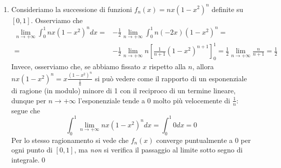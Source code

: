 \begin{examples}
\begin{enumerate}[label=\Roman*]
\begin{equation*}
\begin{cases}
\begin{array}{ll}
				\frac{1}{n}&\text{se }n\leq x\leq2n\\
				0 &\text{se }x<n\vee x>2n
			\end{array}
		\end{cases}
	\end{equation*}
	Osserviamo che
	\begin{align*}
		\lim_{n\to+\infty}\int_{0}^{+\infty}f_n(x)dx=&\lim_{n\to+\infty}\left[\int_{0}^{n}0dx+\int_{n}^{2n}\frac{1}{n}dx+\int_{2n}^{+\infty}0dx\right]=\lim_{n\to+\infty}\int_{n}^{2n}\frac{1}{n}dx=\\
		=&\lim_{n\to+\infty}\left[\frac{x}{n}\right]_{n}^{2n}=\lim_{n\to+\infty}\frac{2n-n}{n}=\lim_{n\to+\infty}1=1
	\end{align*}
	Invece, si vede immediatamente che
	\begin{equation*}
		\int_{0}^{+\infty}\lim_{n\to+\infty}f_n(x)dx=\int_{0}^{+\infty}0dx=0
	\end{equation*}
	Vediamo che $f_n$ converge uniformemente su $\left[0,+\infty\right)$ a $0$:
	\begin{gather*}
		\sup_{x\in\left[0,+\infty\right)}\abs{f_n(x)-f(x)}=\frac{1}{n}\\
		\lim_{n\to+\infty}\left(\sup_{x\in\left[0,+\infty\right)}\right)=\lim_{n\to+\infty}\frac{1}{n}=0
	\end{gather*}
	Anche aggiungendo al teorema l'ipotesi che $f(x)$ sia Riemann-integrabile (in questo caso ciò è verificato), il passaggio al limite sotto segno di integrale \textit{non} si verifica \textit{necessariamente} se l'intervallo è illimitato.
	\item 	Consideriamo la successione di funzioni $f_n(x)=nx\left(1-x^2\right)^n$ definite su $\left[0,1\right]$. Osserviamo che
	\begin{align*}
		\lim_{n\to+\infty}\int_{0}^{1}nx\left(1-x^2\right)^ndx=&-\frac{1}{2}\lim_{n\to+\infty}\int_{0}^{1}n\left(-2x\right)\left(1-x^2\right)^n=\\
		=&-\frac{1}{2}\lim_{n\to+\infty}n\left[\frac{1}{n+1}\left(1-x^2\right)^{n+1}\right]_{0}^{1}=\frac{1}{2}\lim_{n\to+\infty}\frac{n}{n+1}=\frac{1}{2}
	\end{align*}
	Invece, osserviamo che, se abbiamo fissato $x$ rispetto alla $n$, allora $nx\left(1-x^2\right)^n=x\frac{\left(1-x^2\right)^n}{\frac{1}{n}}$ si può vedere come il rapporto di un esponenziale di ragione (in modulo) minore di 1 con il reciproco di un termine lineare, dunque per $n\to+\infty$ l'esponenziale tende a $0$ molto più velocemente di $\frac{1}{n}$: segue che
	\begin{equation*}
		\int_{0}^{1}\lim_{n\to+\infty}nx\left(1-x^2\right)^ndx=\int_{0}^{1}0dx=0
	\end{equation*}
	Per lo stesso ragionamento si vede che $f_n(x)$ converge puntualmente a $0$ per ogni punto di $\left[0,1\right]$, ma \textit{non} si verifica il passaggio al limite sotto segno di integrale.\qed
\end{enumerate}
\end{examples}
